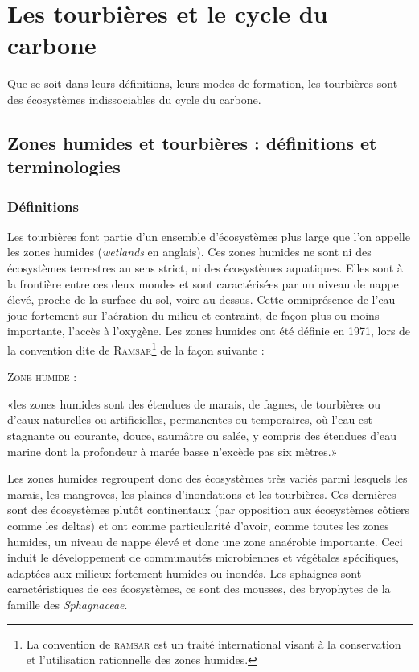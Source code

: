 \section{Les tourbières et le cycle du carbone}

Que se soit dans leurs définitions, leurs modes de formation, les tourbières sont des écosystèmes indissociables du cycle du carbone.

\subsection{Zones humides et tourbières : définitions et terminologies}

\subsubsection{Définitions}

Les tourbières font partie d'un ensemble d'écosystèmes plus large que l'on appelle les zones humides (\textit{wetlands} en anglais).
Ces zones humides ne sont ni des écosystèmes terrestres au sens strict, ni des écosystèmes aquatiques.
Elles sont à la frontière entre ces deux mondes et sont caractérisées par un niveau de nappe élevé, proche de la surface du sol, voire au dessus.
Cette omniprésence de l'eau joue fortement sur l'aération du milieu et contraint, de façon plus ou moins importante, l'accès à l'oxygène.
Les zones humides ont été définie en 1971, lors de la convention dite de \textsc{Ramsar}\footnote{La convention de \textsc{ramsar} est un traité international visant à la conservation et l’utilisation rationnelle des zones humides.} de la façon suivante : 
\begin{pdef}
\textsc{Zone humide} :

«les zones humides sont des étendues de marais, de fagnes\footnotemark, de tourbières ou d'eaux naturelles ou artificielles, permanentes ou temporaires, où l'eau est stagnante ou courante, douce, saumâtre ou salée, y compris des étendues d'eau marine dont la profondeur à marée basse n'excède pas six mètres.»

\hfill {\scriptsize \citep{ramsar1987}}
\end{pdef}

Les zones humides regroupent donc des écosystèmes très variés parmi lesquels les marais, les mangroves, les plaines d'inondations et les tourbières.
Ces dernières sont des écosystèmes plutôt continentaux (par opposition aux écosystèmes côtiers comme les deltas) et ont comme particularité d'avoir, comme toutes les zones humides, un niveau de nappe élevé et donc une zone anaérobie importante.
Ceci induit le développement de communautés microbiennes et végétales spécifiques, adaptées aux milieux fortement humides ou inondés.
Les sphaignes sont caractéristiques de ces écosystèmes, ce sont des mousses, des bryophytes de la famille des \textit{Sphagnaceae}.

